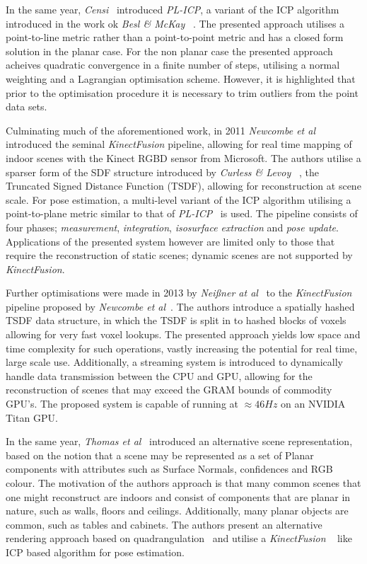 In the same year, \textit{Censi}~\cite{Censi2008} introduced \textit{PL-ICP}, a 
variant of the ICP algorithm introduced in the work ok \textit{Besl \& McKay} 
~\cite{Besl1992}. The presented approach utilises a point-to-line metric rather than 
a point-to-point metric and has a closed form solution in the planar case. For the non 
planar case the presented approach acheives quadratic convergence in a finite number of 
steps, utilising a normal weighting and a Lagrangian optimisation scheme. However, it is 
highlighted that prior to the optimisation procedure it is necessary to trim outliers 
from the point data sets.

Culminating much of the aforementioned work, in 2011 \textit{Newcombe et al} 
~\cite{Newcombe2011} introduced the seminal \textit{KinectFusion} pipeline, allowing 
for real time mapping of indoor scenes with the Kinect RGBD sensor from Microsoft. The 
authors utilise a sparser form of the SDF structure introduced by \textit{Curless \& Levoy} 
~\cite{Curless1996}, the Truncated Signed Distance Function (TSDF), allowing for reconstruction 
at scene scale. For pose estimation, a multi-level variant of the ICP algorithm utilising a 
point-to-plane metric similar to that of \textit{PL-ICP}~\cite{Censi2008} is used. The pipeline 
consists of four phases; \textit{measurement}, \textit{integration}, \textit{isosurface extraction} 
and \textit{pose update}. Applications of the presented system however are limited only to 
those that require the reconstruction of static scenes; dynamic scenes are not supported 
by \textit{KinectFusion}.

Further optimisations were made in 2013 by \textit{Nei{\ss}ner at al}~\cite{NieBner2013} to the 
\textit{KinectFusion} pipeline proposed by \textit{Newcombe et al}~\cite{Newcombe2011}. The authors 
introduce a spatially hashed TSDF data structure, in which the TSDF is split in to hashed blocks of 
voxels allowing for very fast voxel lookups. The presented approach yields low space and time complexity 
for such operations, vastly increasing the potential for real time, large scale use. Additionally, 
a streaming system is introduced to dynamically handle data transmission between the CPU and GPU, 
allowing for the reconstruction of scenes that may exceed the GRAM bounds of commodity GPU's. The 
proposed system is capable of running at \(\approx46Hz\) on an NVIDIA Titan GPU.

In the same year, \textit{Thomas et al}~\cite{Thomas2013} introduced an alternative scene 
representation, based on the notion that a scene may be represented as a set of Planar 
components with attributes such as Surface Normals, confidences and RGB colour. The motivation 
of the authors approach is that many common scenes that one might reconstruct are indoors and 
consist of components that are planar in nature, such as walls, floors and ceilings. Additionally, 
many planar objects are common, such as tables and cabinets. The authors present an alternative 
rendering approach based on quadrangulation~\cite{Dong2006} and utilise a \textit{KinectFusion} 
~\cite{Newcombe2011} like ICP based algorithm for pose estimation.

